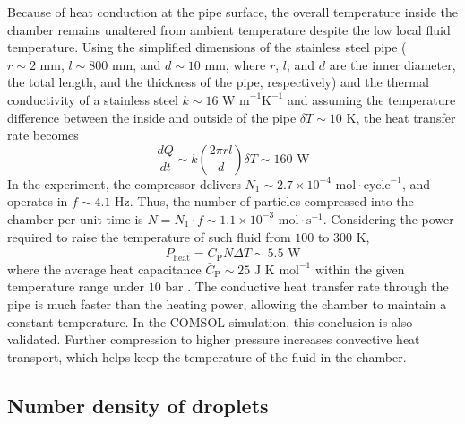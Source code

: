 Because of heat conduction at the pipe surface, the overall temperature inside the chamber remains unaltered from ambient temperature despite the low local fluid temperature. Using the simplified dimensions of the stainless steel pipe ($r∼2 \text{ mm}$, $l∼800 \text{ mm}$, and $d∼10 \text{ mm}$, where $r$, $l$, and $d$ are the inner diameter, the total length, and the thickness of the pipe, respectively) and the thermal conductivity of a stainless steel $k \sim 16 \text{ W m}^{-1}\text{K}^{-1}$ and assuming the temperature difference between the inside and outside of the pipe $\delta T \sim 10 \text{ K}$, the heat transfer rate becomes
\begin{equation}
\frac{d Q}{d t} \sim k \left( \frac{2 \pi r l}{d} \right) \delta T \sim 160 \text{ W}
\end{equation}
In the experiment, the compressor delivers $N_1 \sim 2.7 \times 10^{-4} \text{ mol} \cdot \text{cycle}^{-1}$, and operates in $f \sim 4.1 \text{ Hz}$. Thus, the number of particles compressed into the chamber per unit time is $N = N_1 \cdot f \sim 1.1 \times 10^{-3} \text{ mol} \cdot \text{s}^{-1}$. Considering the power required to raise the temperature of such fluid from $100$ to $300 \text{ K}$,
\begin{equation}
P_{\text {heat}}=\bar{C}_{\text{P}} N \Delta T \sim 5.5 \text{ W}
\end{equation}
where the average heat capacitance $\bar{C}_{\text{P}} \sim 25 \text{ J K mol}^{-1}$ within the given temperature range under $10 \text{ bar}$ \cite{linstorm2020nist}. The conductive heat transfer rate through the pipe is much faster than the heating power, allowing the chamber to maintain a constant temperature. In the COMSOL simulation, this conclusion is also validated. Further compression to higher pressure increases convective heat transport, which helps keep the temperature of the fluid in the chamber.

\subsection{Number density of droplets}
\label{sec:ch2-3-2}

